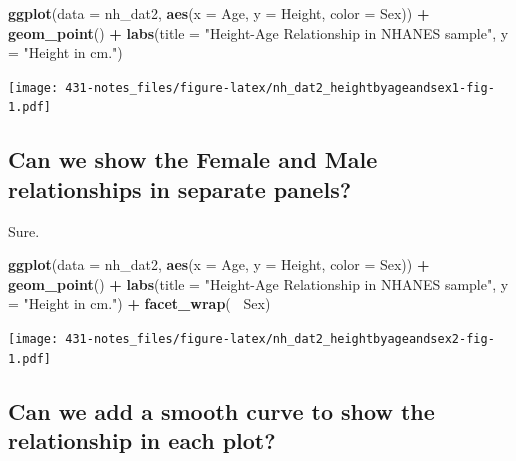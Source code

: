\documentclass[
]{book}
\newenvironment{Shaded}{\begin{snugshade}}{\end{snugshade}}
\newcommand{\DataTypeTok}[1]{\textcolor[rgb]{0.13,0.29,0.53}{#1}}
\newcommand{\KeywordTok}[1]{\textcolor[rgb]{0.13,0.29,0.53}{\textbf{#1}}}
\newcommand{\NormalTok}[1]{#1}
\newcommand{\OperatorTok}[1]{\textcolor[rgb]{0.81,0.36,0.00}{\textbf{#1}}}
\newcommand{\StringTok}[1]{\textcolor[rgb]{0.31,0.60,0.02}{#1}}
\begin{document}
\begin{Shaded}
\begin{Highlighting}[]
\KeywordTok{ggplot}\NormalTok{(}\DataTypeTok{data =}\NormalTok{ nh_dat2, }\KeywordTok{aes}\NormalTok{(}\DataTypeTok{x =}\NormalTok{ Age, }\DataTypeTok{y =}\NormalTok{ Height, }\DataTypeTok{color =}\NormalTok{ Sex)) }\OperatorTok{+}
\StringTok{    }\KeywordTok{geom_point}\NormalTok{() }\OperatorTok{+}
\StringTok{    }\KeywordTok{labs}\NormalTok{(}\DataTypeTok{title =} \StringTok{"Height-Age Relationship in NHANES sample"}\NormalTok{, }
         \DataTypeTok{y =} \StringTok{"Height in cm."}\NormalTok{)}
\end{Highlighting}
\end{Shaded}

\texttt{[image: 431-notes\_files/figure-latex/nh\_dat2\_heightbyageandsex1-fig-1.pdf]}

\hypertarget{can-we-show-the-female-and-male-relationships-in-separate-panels}{%
\subsection{Can we show the Female and Male relationships in separate panels?}\label{can-we-show-the-female-and-male-relationships-in-separate-panels}}

Sure.

\begin{Shaded}
\begin{Highlighting}[]
\KeywordTok{ggplot}\NormalTok{(}\DataTypeTok{data =}\NormalTok{ nh_dat2, }\KeywordTok{aes}\NormalTok{(}\DataTypeTok{x =}\NormalTok{ Age, }\DataTypeTok{y =}\NormalTok{ Height, }\DataTypeTok{color =}\NormalTok{ Sex)) }\OperatorTok{+}
\StringTok{    }\KeywordTok{geom_point}\NormalTok{() }\OperatorTok{+}\StringTok{ }
\StringTok{    }\KeywordTok{labs}\NormalTok{(}\DataTypeTok{title =} \StringTok{"Height-Age Relationship in NHANES sample"}\NormalTok{, }
         \DataTypeTok{y =} \StringTok{"Height in cm."}\NormalTok{) }\OperatorTok{+}
\StringTok{    }\KeywordTok{facet_wrap}\NormalTok{(}\OperatorTok{~}\StringTok{ }\NormalTok{Sex)}
\end{Highlighting}
\end{Shaded}

\texttt{[image: 431-notes\_files/figure-latex/nh\_dat2\_heightbyageandsex2-fig-1.pdf]}

\hypertarget{can-we-add-a-smooth-curve-to-show-the-relationship-in-each-plot}{%
\subsection{Can we add a smooth curve to show the relationship in each plot?}\label{can-we-add-a-smooth-curve-to-show-the-relationship-in-each-plot}}
\end{document}
